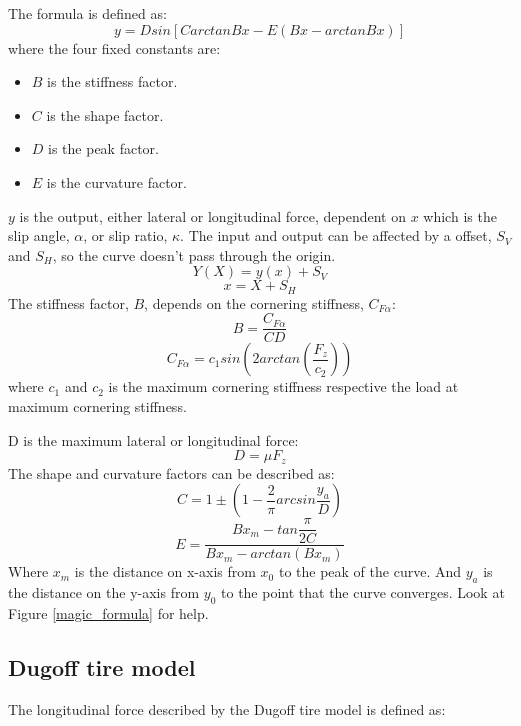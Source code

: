 The formula is defined as:
\begin{equation}
	y = Dsin[CarctanBx-E(Bx-arctanBx)]
\end{equation}
where the four fixed constants are:
\begin{itemize}
	\item $ B $ is the stiffness factor.
	\item $ C $ is the shape factor.
	\item $ D $ is the peak factor.
	\item $ E $ is the curvature factor.
\end{itemize}
$ y $ is the output, either lateral or longitudinal force, dependent on $ x $ which is the slip angle, $ \alpha $, or slip ratio, $ \kappa $. The input and output can be affected by a offset, $ S_{V} $ and $ S_{H} $, so the curve doesn't pass through the origin.
\begin{equation}
	Y(X) = y(x) + S_{V}
\end{equation}
\begin{equation}
	x = X + S_{H}
\end{equation}
The stiffness factor, $ B $, depends on the cornering stiffness, $ C_{F\alpha} $:
\begin{equation}
	B = \dfrac{C_{F\alpha}}{CD}
\end{equation}
\begin{equation}
	C_{F\alpha} = c_{1}sin(2arctan(\dfrac{F_{z}}{c_{2}}))
\end{equation}
where $ c_{1} $ and $ c_{2} $ is the maximum cornering stiffness respective the load at maximum cornering stiffness.

D is the maximum lateral or longitudinal force:
\begin{equation}
	D = \mu F_{z}
\end{equation}
The shape and curvature factors can be described as:
\begin{equation}
	C = 1 \pm (1 - \dfrac{2}{\pi}arcsin\dfrac{y_{a}}{D})
\end{equation}
\begin{equation}
	E = \dfrac{Bx_{m} - tan{\dfrac{\pi}{2C}}}{Bx_{m} - arctan(Bx_{m})}
\end{equation}
Where $ x_{m} $ is the distance on x-axis from $ x_{0} $ to the peak of the curve. And $ y_{a} $ is the distance on the y-axis from $ y_{0} $ to the point that the curve converges. Look at Figure \ref{magic_formula} for help.
\subsection{Dugoff tire model}
The longitudinal force described by the Dugoff tire model is defined as:


